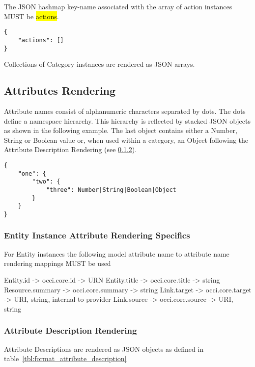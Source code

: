 \documentclass[10pt,a4paper]{article}
\begin{document}
The JSON hashmap key-name associated with the array of action instances MUST be \hl{actions}.

\begin{lstlisting}
{
    "actions": []
}
\end{lstlisting}


Collections of Category instances are rendered as JSON arrays.

\subsection{Attributes Rendering}

Attribute names consist of alphanumeric characters separated by dots. The dots
define a namespace hierarchy. This hierarchy is reflected by stacked JSON
objects as shown in the following example. The last object contains either a
Number, String or Boolean value or, when used within a category, an Object
following the Attribute Description Rendering (see
\ref{sec:format_attribute_description}).
\begin{lstlisting}
{
    "one": {
        "two": {
            "three": Number|String|Boolean|Object
        }
    }
}
\end{lstlisting}

\subsubsection{Entity Instance Attribute Rendering Specifics}

For Entity instances the following model attribute name to attribute name rendering mappings MUST be used

Entity.id -> occi.core.id -> URN
Entity.title -> occi.core.title -> string
Resource.summary -> occi.core.summary -> string
Link.target -> occi.core.target -> URI, string, internal to provider
Link.source -> occi.core.source -> URI, string



\subsubsection{Attribute Description Rendering}
\label{sec:format_attribute_description}

Attribute Descriptions are rendered as JSON objects as defined in table~\ref{tbl:format_attribute_description}
\end{document}
